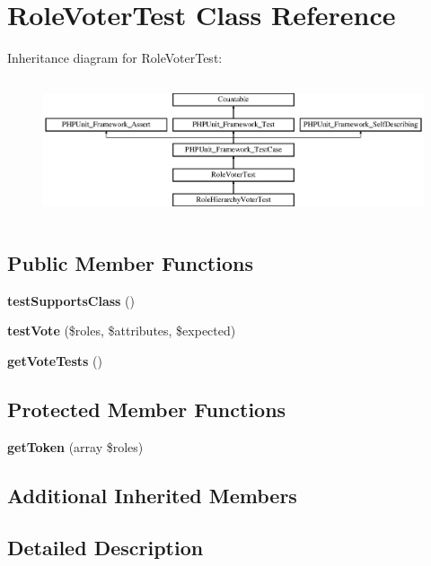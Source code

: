 \section{Role\+Voter\+Test Class Reference}
\label{class_symfony_1_1_component_1_1_security_1_1_core_1_1_tests_1_1_authorization_1_1_voter_1_1_role_voter_test}
Inheritance diagram for Role\+Voter\+Test\+:\begin{figure}[H]
\begin{center}
\leavevmode
\includegraphics[height=4.129793cm]{class_symfony_1_1_component_1_1_security_1_1_core_1_1_tests_1_1_authorization_1_1_voter_1_1_role_voter_test}
\end{center}
\end{figure}
\subsection*{Public Member Functions}
\begin{DoxyCompactItemize}
\item 
{\bf test\+Supports\+Class} ()
\item 
{\bf test\+Vote} (\$roles, \$attributes, \$expected)
\item 
{\bf get\+Vote\+Tests} ()
\end{DoxyCompactItemize}
\subsection*{Protected Member Functions}
\begin{DoxyCompactItemize}
\item 
{\bf get\+Token} (array \$roles)
\end{DoxyCompactItemize}
\subsection*{Additional Inherited Members}


\subsection{Detailed Description}


